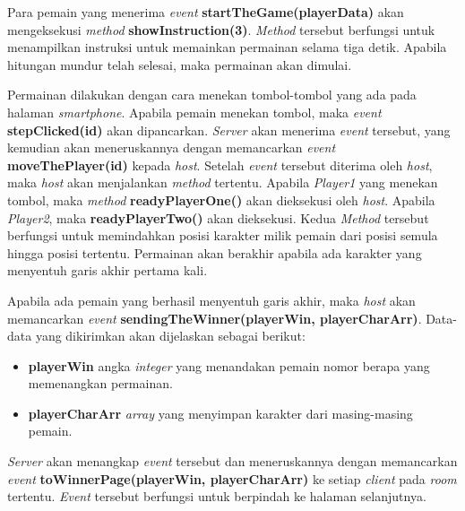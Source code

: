 Para pemain yang menerima \textit{event} \textbf{startTheGame(playerData)} akan mengeksekusi \textit{method} \textbf{showInstruction(3)}. \textit{Method} tersebut berfungsi untuk menampilkan instruksi untuk memainkan permainan selama tiga detik. Apabila hitungan mundur telah selesai, maka permainan akan dimulai.

Permainan dilakukan dengan cara menekan tombol-tombol yang ada pada halaman \textit{smartphone}. Apabila pemain menekan tombol, maka \textit{event} \textbf{stepClicked(id)} akan dipancarkan. \textit{Server} akan menerima \textit{event} tersebut, yang kemudian akan meneruskannya dengan memancarkan \textit{event} \textbf{moveThePlayer(id)} kepada \textit{host}. Setelah \textit{event} tersebut diterima oleh \textit{host}, maka \textit{host} akan menjalankan \textit{method} tertentu. Apabila \textit{Player1} yang menekan tombol, maka \textit{method} \textbf{readyPlayerOne()} akan dieksekusi oleh \textit{host}. Apabila \textit{Player2}, maka \textbf{readyPlayerTwo()} akan dieksekusi. Kedua \textit{Method} tersebut berfungsi untuk memindahkan posisi karakter milik pemain dari posisi semula hingga posisi tertentu. Permainan akan berakhir apabila ada karakter yang menyentuh garis akhir pertama kali.

Apabila ada pemain yang berhasil menyentuh garis akhir, maka \textit{host} akan memancarkan \textit{event} \textbf{sendingTheWinner(playerWin, playerCharArr)}. Data-data yang dikirimkan akan dijelaskan sebagai berikut:
\begin{itemize}
	\item \textbf{playerWin} angka \textit{integer} yang menandakan pemain nomor berapa yang memenangkan permainan.
	\item \textbf{playerCharArr} \textit{array} yang menyimpan karakter dari masing-masing pemain.
\end{itemize}
\textit{Server} akan menangkap \textit{event} tersebut dan meneruskannya dengan memancarkan \textit{event} \textbf{toWinnerPage(playerWin, playerCharArr)} ke setiap \textit{client} pada \textit{room} tertentu. \textit{Event} tersebut berfungsi untuk berpindah ke halaman selanjutnya.

